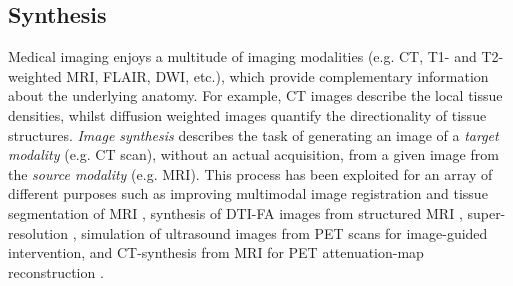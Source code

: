 

\subsection*{Synthesis}
Medical imaging enjoys a multitude of imaging modalities (e.g. CT, T1- and T2-weighted MRI, FLAIR, DWI, etc.), which provide complementary information about the underlying anatomy. For example, CT images describe the local tissue densities, whilst diffusion weighted images quantify the directionality of tissue structures. \textit{Image synthesis} describes the task of generating an image of a\textit{ target modality} (e.g. CT scan), without an actual acquisition, from a given image from the \textit{source modality} (e.g. MRI). This process has been exploited for an array of different purposes such as improving multimodal image registration and tissue segmentation of MRI \cite{iglesias2013synthesizing}, synthesis of DTI-FA images from structured MRI \cite{ye2013modality}, super-resolution \cite{rousseau2008brain,zhang2012hierarchical}, simulation of ultrasound images from PET scans \cite{wein2008automatic} for image-guided intervention, and CT-synthesis from MRI for PET attenuation-map reconstruction \cite{burgos2014attenuation}. 

